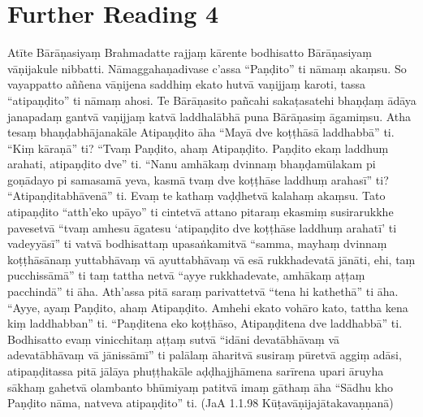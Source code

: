 \section*{Further Reading 4}

Atīte Bārāṇasiyaṃ Brahmadatte rajjaṃ kārente bodhisatto Bārāṇasiyaṃ vāṇijakule nibbatti. Nāmaggahaṇadivase c’assa “Paṇḍito” ti nāmaṃ akaṃsu. So vayappatto aññena vāṇijena saddhiṃ ekato hutvā vaṇijjaṃ karoti, tassa “atipaṇḍito” ti nāmaṃ ahosi. Te Bārāṇasito pañcahi sakaṭasatehi bhaṇḍaṃ ādāya janapadaṃ gantvā vaṇijjaṃ katvā laddhalābhā puna Bārāṇasiṃ āgamiṃsu. Atha tesaṃ bhaṇḍabhājanakāle Atipaṇḍito āha “Mayā dve koṭṭhāsā laddhabbā” ti. “Kiṃ kāraṇā” ti? “Tvaṃ Paṇḍito, ahaṃ Atipaṇḍito. Paṇḍito ekaṃ laddhuṃ arahati, atipaṇḍito dve” ti. “Nanu amhākaṃ dvinnaṃ bhaṇḍamūlakam pi goṇādayo pi samasamā yeva, kasmā tvaṃ dve koṭṭhāse laddhuṃ arahasī” ti? “Atipaṇḍitabhāvenā” ti. Evaṃ te kathaṃ vaḍḍhetvā kalahaṃ akaṃsu. Tato atipaṇḍito “atth’eko upāyo” ti cintetvā attano pitaraṃ ekasmiṃ susirarukkhe pavesetvā “tvaṃ amhesu āgatesu ‘atipaṇḍito dve koṭṭhāse laddhuṃ arahatī’ ti vadeyyāsī” ti vatvā bodhisattaṃ upasaṅkamitvā “samma, mayhaṃ dvinnaṃ koṭṭhāsānaṃ yuttabhāvaṃ vā ayuttabhāvaṃ vā esā rukkhadevatā jānāti, ehi, taṃ pucchissāmā” ti taṃ tattha netvā “ayye rukkhadevate, amhākaṃ aṭṭaṃ pacchindā” ti āha. Ath’assa pitā saraṃ parivattetvā “tena hi kathethā” ti āha. “Ayye, ayaṃ Paṇḍito, ahaṃ Atipaṇḍito. Amhehi ekato vohāro kato, tattha kena kiṃ laddhabban” ti. “Paṇḍitena eko koṭṭhāso, Atipaṇḍitena dve laddhabbā” ti. Bodhisatto evaṃ vinicchitaṃ aṭṭaṃ sutvā “idāni devatābhāvaṃ vā adevatābhāvaṃ vā jānissāmī” ti palālaṃ āharitvā susiraṃ pūretvā aggiṃ adāsi, atipaṇḍitassa pitā jālāya phuṭṭhakāle aḍḍhajjhāmena sarīrena upari āruyha sākhaṃ gahetvā olambanto bhūmiyaṃ patitvā imaṃ gāthaṃ āha “Sādhu kho Paṇḍito nāma, natveva atipaṇḍito” ti. \hfill(JaA 1.1.98 Kūṭavāṇijajātakavaṇṇanā)